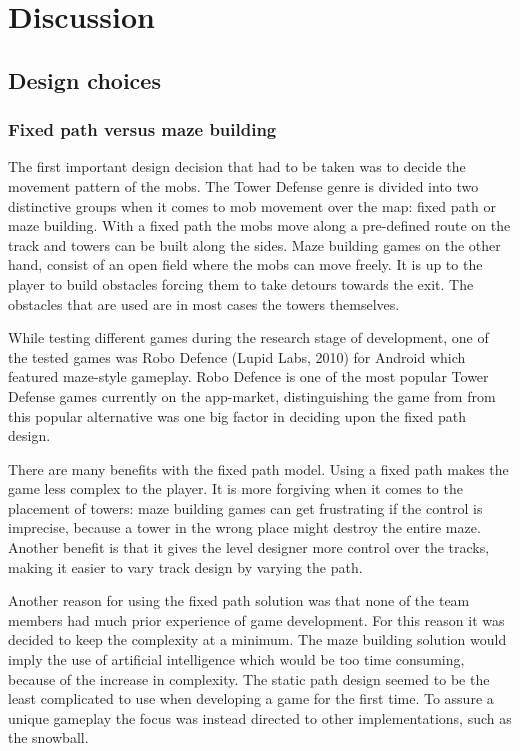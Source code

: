 \chapter{Discussion}
\section{Design choices}
\subsection{Fixed path versus maze building}

The first important design decision that had to be taken was to decide the movement pattern of the mobs. The Tower Defense genre is divided into two distinctive groups when it comes to mob movement over the map: fixed path or maze building. With a fixed path the mobs move along a pre-defined route on the track and towers can be built along the sides. Maze building games on the other hand, consist of an open field where the mobs can move freely. It is up to the player to build obstacles forcing them to take detours towards the exit. The obstacles that are used are in most cases the towers themselves. 

While testing different games during the research stage of development, one of the tested games was Robo Defence (Lupid Labs, 2010) for Android which featured maze-style gameplay. Robo Defence is one of the most popular Tower Defense games currently on the app-market, distinguishing the game from from this popular alternative was one big factor in deciding upon the fixed path design.

There are many benefits with the fixed path model. Using a fixed path makes the game less complex to the player. It is more forgiving when it comes to the placement of towers: maze building games can get frustrating if the control is imprecise, because a tower in the wrong place might destroy the entire maze. Another benefit is that it gives the level designer more control over the tracks, making it easier to vary track design by varying the path.

Another reason for using the fixed path solution was that none of the team members had much prior experience of game development. For this reason it was decided to keep the complexity at a minimum. The maze building solution would imply the use of artificial intelligence which would be too time consuming, because of the increase in complexity. The static path design seemed to be the least complicated to use when developing a game for the first time. To assure a unique gameplay the focus was instead directed to other implementations, such as the snowball.
